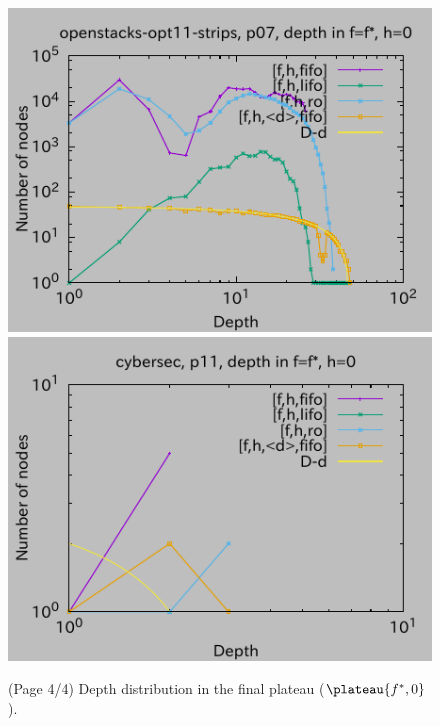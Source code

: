 \begin{figure}[htbp]
\includegraphics{img/depth/openstacks-opt11-strips/p07.pdf}
\includegraphics{img/depth/cybersec/p11.pdf}
 \caption{(Page 4/4) Depth distribution in the final plateau ($\plateau{f^*,0}$).}
 \label{fig:depth-histogram4}
\end{figure}

